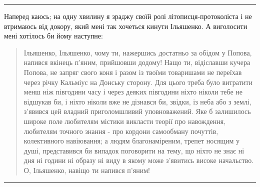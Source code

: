 \documentclass[a4paper,20pt]{report}
\begin{document}
\par\noindent\rule{\textwidth}{0.4pt}

Наперед каюсь; на одну хвилину я зраджу своїй ролі літописця-протоколіста і не втримаюсь від 
докору, який мені так хочеться кинути Ільяшенко. А виголосити мені хотілось би йому наступне:

\begin{quote}
\em\bfseries

Ільяшенко, Ільяшенко, чому ти, нажершись достатньо за обідом у Попова, напився
вкінець п'яним, прийшовши додому! Нащо ти, відіславши кучера Попова, не
запряг свого коня і разом із твоїми товаришами не переїхав через річку
Кальміус на Донську сторону.  Для цього треба було витратити менш ніж
півгодини часу і через деяких півгодини ніхто ніколи тебе не відшукав
би, і ніхто ніколи вже не дізнався би, звідки, із неба або з землі,
з'явився цей владний приголомшливий уповноважений. Яке б залишилось
широке поле любителям містики викласти теорії про навождення, любителям
точного знання - про кордони самообману почуттів, колективного
навіювання; а людям благонаміреним, трепет носящим у душі, представився
би випадок поговорити на тему, що ніхто не знає ні дня ні години ні
образу ні виду в якому може з'явитись високе начальство. О, Ільяшенко,
навіщо ти напився п'яним!
	

\end{quote}

\par\noindent\rule{\textwidth}{0.4pt}
\end{document}
